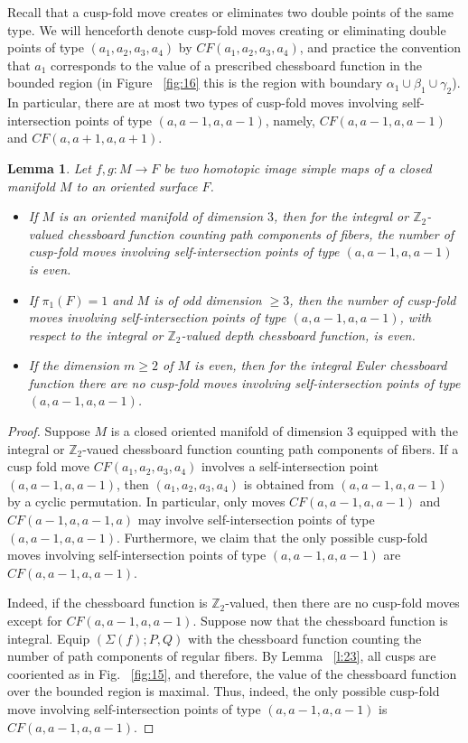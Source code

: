 \documentclass[12pt]{amsart}
\def \Z{\mathbb{Z}}
\newtheorem{lemma}[theorem]{Lemma}
\theoremstyle{definition}
\begin{document}
{ Recall that a cusp-fold move creates or eliminates two double points of the same type. We will henceforth denote cusp-fold moves creating or eliminating double points of type $(a_1,a_2,a_3,a_4)$ by $CF(a_1,a_2,a_3,a_4)$,  and practice the convention that $a_1$ corresponds to the value of a prescribed chessboard function in the bounded region (in Figure ~\ref{fig:16} this is the region with boundary $\alpha_1 \cup \beta_1 \cup \gamma_2$).  In particular, there are at most two types of cusp-fold moves involving self-intersection points of type $(a, a-1, a, a-1)$, namely, $CF(a, a-1, a, a-1)$ and $CF(a, a+1, a, a+1)$.

 \begin{lemma}\label{l:22}
Let $f,g:M\rightarrow F$ be two homotopic image simple maps of a closed manifold $M$ to an oriented surface $F$.  
\begin{itemize}
\item If $M$ is an oriented manifold of dimension $3$, then for the integral or $\Z_2$-valued chessboard function counting path components of fibers, the number of cusp-fold moves involving self-intersection points of type $(a,a-1,a,a-1)$ is even. 
\item If $\pi_1(F)=1$ and $M$ is of odd dimension $\ge 3$,  then the number of cusp-fold moves involving self-intersection points of type $(a,a-1,a,a-1)$, with respect to the integral or $\Z_2$-valued depth chessboard function, is even.  
\item If the dimension  $m\ge 2$ of $M$ is even,  then for the integral Euler chessboard function there are no cusp-fold moves involving self-intersection points of type $(a, a-1, a, a-1)$. 
\end{itemize}
\end{lemma}

\begin{proof} 
	Suppose $M$ is a closed oriented manifold of dimension $3$ equipped with the integral or $\Z_2$-vaued chessboard function counting path components of fibers. If a cusp fold move $CF(a_1, a_2, a_3, a_4)$ involves a self-intersection point $(a, a-1, a, a-1)$, then $(a_1, a_2, a_3, a_4)$ is obtained from $(a, a-1, a, a-1)$ by a cyclic permutation. In particular, only moves $CF(a, a-1, a, a-1)$ and $CF(a-1, a, a-1, a)$ may involve self-intersection points of type $(a, a-1, a, a-1)$. Furthermore, we claim that  the only possible cusp-fold moves involving self-intersection points of type $(a,a-1,a,a-1)$ are $CF(a,a-1,a,a-1)$. 

Indeed, if the chessboard function is $\Z_2$-valued, then there are no cusp-fold moves except for $CF(a, a-1, a, a-1)$. Suppose now that the chessboard function is integral. Equip 
 $(\Sigma(f);P,Q)$ with the chessboard function counting the number of path  components of regular fibers.  By Lemma ~\ref{l:23},  all cusps are cooriented as in Fig. ~\ref{fig:15}, and therefore, the value of the chessboard function over the bounded region is maximal. Thus, indeed, the only possible cusp-fold move involving self-intersection points of type $(a,a-1,a,a-1)$ is $CF(a,a-1,a,a-1)$. 
 

\end{proof}}
\end{document}
